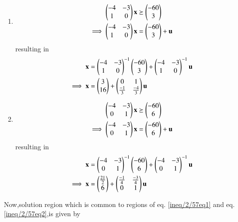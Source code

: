 \begin{enumerate}
    \item 
    \begin{align}
        \begin{pmatrix}-4 & -3 \\ 1 & 0\end{pmatrix}\mathbf{x} &\succeq \begin{pmatrix}-60 \\ 3\end{pmatrix}
        \\
        \implies  \begin{pmatrix}-4 & -3 \\ 1 & 0\end{pmatrix}\mathbf{x} &= \begin{pmatrix}-60 \\ 3\end{pmatrix} + \mathbf{u}
    \end{align}
    resulting in 
    \begin{align}
        \mathbf{x} &= \begin{pmatrix}-4 & -3 \\1 & 0\end{pmatrix}^{-1}\begin{pmatrix}-60 \\ 3\end{pmatrix} + \begin{pmatrix}-4 & -3 \\1 & 0\end{pmatrix}^{-1}\mathbf{u}
        \\
        \implies \mathbf{x} &= \begin{pmatrix}3 \\16\end{pmatrix} + \begin{pmatrix}0 & 1\\ \frac{-1}{3} & \frac{-4}{3}\end{pmatrix}\mathbf{u}   \label{ineq/2/57eq1}
    \end{align}

    \item 
    \begin{align}
        \begin{pmatrix}-4 & -3 \\ 0 & 1\end{pmatrix}\mathbf{x} &\succeq \begin{pmatrix}-60 \\ 6\end{pmatrix}
        \\
        \implies  \begin{pmatrix}-4 & -3 \\ 0 & 1\end{pmatrix}\mathbf{x} &= \begin{pmatrix}-60 \\ 6\end{pmatrix} + \mathbf{u}
    \end{align}
    resulting in 
    \begin{align}
        \mathbf{x} &= \begin{pmatrix}-4 & -3 \\0 & 1\end{pmatrix}^{-1}\begin{pmatrix}-60 \\ 6\end{pmatrix} + \begin{pmatrix}-4 & -3 \\0 & 1\end{pmatrix}^{-1}\mathbf{u}
        \\
        \implies \mathbf{x} &= \begin{pmatrix}\frac{21}{2} \\6\end{pmatrix} + \begin{pmatrix}\frac{-1}{4} & \frac{-3}{4}\\ 0 & 1\end{pmatrix}\mathbf{u} \label{ineq/2/57eq2}
    \end{align}
\end{enumerate}

Now,solution region which is common to regions of eq. \eqref{ineq/2/57eq1} and eq. \eqref{ineq/2/57eq2},is given by

